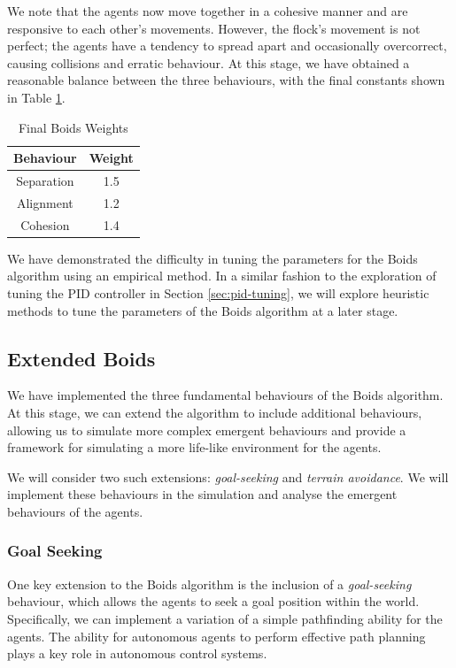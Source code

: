 \documentclass[12pt]{article}
\begin{document}
We note that the agents now move together in a cohesive manner and are responsive to each other's movements. However, the flock's movement is not perfect; the agents have a tendency to spread apart and occasionally overcorrect, causing collisions and erratic behaviour. At this stage, we have obtained a reasonable balance between the three behaviours, with the final constants shown in Table \ref{tab:boids-weights-final}.

\begin{table}[ht]
    \centering
    \begin{tabular}{| c | c |} 
    \hline
    Behaviour & Weight \\ 
    \hline\hline
    Separation & 1.5 \\
    \hline
    Alignment & 1.2 \\
    \hline
    Cohesion & 1.4 \\
    \hline
    \end{tabular}
    \caption{Final Boids Weights}
    \label{tab:boids-weights-final}
\end{table}

We have demonstrated the difficulty in tuning the parameters for the Boids algorithm using an empirical method. In a similar fashion to the exploration of tuning the PID controller in Section \ref{sec:pid-tuning}, we will explore heuristic methods to tune the parameters of the Boids algorithm at a later stage.

\subsection{Extended Boids}
We have implemented the three fundamental behaviours of the Boids algorithm. At this stage, we can extend the algorithm to include additional behaviours, allowing us to simulate more complex emergent behaviours and provide a framework for simulating a more life-like environment for the agents.

We will consider two such extensions: \emph{goal-seeking} and \emph{terrain avoidance}. We will implement these behaviours in the simulation and analyse the emergent behaviours of the agents.



\subsubsection{Goal Seeking}
\label{sec:goal-seek}
One key extension to the Boids algorithm is the inclusion of a \emph{goal-seeking} behaviour, which allows the agents to seek a goal position within the world. Specifically, we can implement a variation of a simple pathfinding ability for the agents. The ability for autonomous agents to perform effective path planning plays a key role in autonomous control systems\cite{liu2020autonomous}. 
\end{document}
